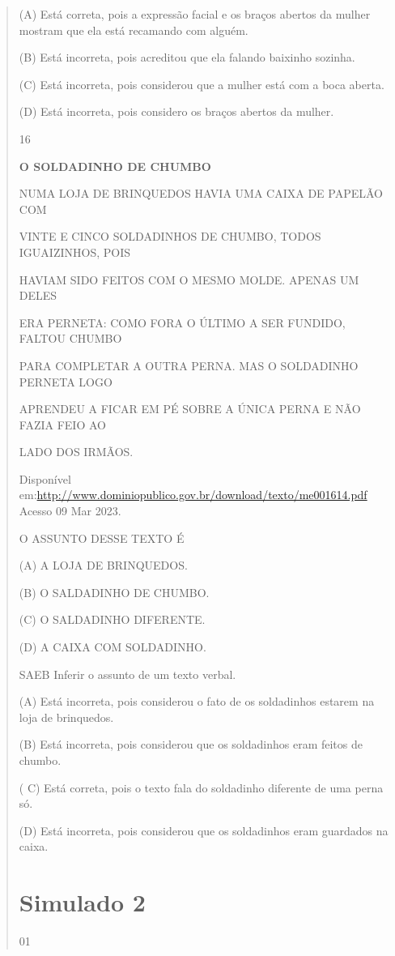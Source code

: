{{{{\begin{verse}
{{\begin{escolha}
{{{{{(A) Está correta, pois a expressão facial e os braços abertos da mulher
mostram que ela está recamando com alguém.

(B) Está incorreta, pois acreditou que ela falando baixinho sozinha.

(C) Está incorreta, pois considerou que a mulher está com a boca aberta.

(D) Está incorreta, pois considero os braços abertos da mulher.

\num{16}

\textbf{O SOLDADINHO DE CHUMBO}

NUMA LOJA DE BRINQUEDOS HAVIA UMA CAIXA DE PAPELÃO COM

VINTE E CINCO SOLDADINHOS DE CHUMBO, TODOS IGUAIZINHOS, POIS

HAVIAM SIDO FEITOS COM O MESMO MOLDE. APENAS UM DELES

ERA PERNETA: COMO FORA O ÚLTIMO A SER FUNDIDO, FALTOU CHUMBO

PARA COMPLETAR A OUTRA PERNA. MAS O SOLDADINHO PERNETA LOGO

APRENDEU A FICAR EM PÉ SOBRE A ÚNICA PERNA E NÃO FAZIA FEIO AO

LADO DOS IRMÃOS.

Disponível
em:\url{http://www.dominiopublico.gov.br/download/texto/me001614.pdf}
Acesso 09 Mar 2023.

O ASSUNTO DESSE TEXTO É

(A) A LOJA DE BRINQUEDOS.

(B) O SALDADINHO DE CHUMBO.

(C) O SALDADINHO DIFERENTE.

(D) A CAIXA COM SOLDADINHO.

SAEB Inferir o assunto de um texto verbal.

(A) Está incorreta, pois considerou o fato de os soldadinhos estarem na
loja de brinquedos.

(B) Está incorreta, pois considerou que os soldadinhos eram feitos de
chumbo.

( C) Está correta, pois o texto fala do soldadinho diferente de uma
perna só.

(D) Está incorreta, pois considerou que os soldadinhos eram guardados na
caixa.

\chapter{Simulado 2}

\num{01}

}}}}}
\end{escolha}}}
\end{verse}}}}}
